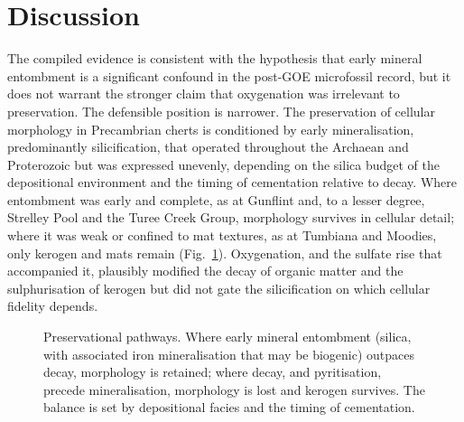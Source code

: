 \documentclass[11pt]{article}
\begin{document}
\section{Discussion}

The compiled evidence is consistent with the hypothesis that early mineral entombment is a
significant confound in the post-GOE microfossil record, but it does not warrant the stronger claim
that oxygenation was irrelevant to preservation. The defensible position is narrower. The
preservation of cellular morphology in Precambrian cherts is conditioned by early mineralisation,
predominantly silicification, that operated throughout the Archaean and Proterozoic but was expressed
unevenly, depending on the silica budget of the depositional environment and the timing of
cementation relative to decay. Where entombment was early and complete, as at Gunflint and, to a
lesser degree, Strelley Pool and the Turee Creek Group, morphology survives in cellular detail;
where it was weak or confined to mat textures, as at Tumbiana and Moodies, only kerogen and mats
remain (Fig.~\ref{fig:model}). Oxygenation, and the sulfate rise that accompanied it, plausibly
modified the decay of organic matter and the sulphurisation of kerogen \citep{Lepot2009,Decraene2021}
but did not gate the silicification on which cellular fidelity depends.

\begin{figure}[t]
\centering
{}
\caption{Preservational pathways. Where early mineral entombment (silica, with associated iron
mineralisation that may be biogenic) outpaces decay, morphology is retained; where decay, and
pyritisation, precede mineralisation, morphology is lost and kerogen survives. The balance is set by
depositional facies and the timing of cementation.}
\label{fig:model}
\end{figure}
\end{document}

